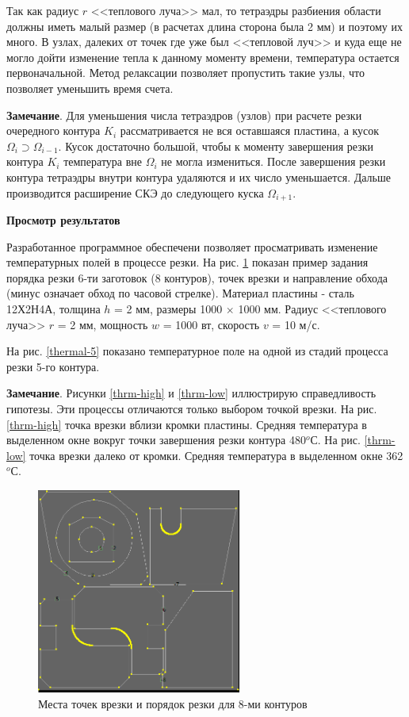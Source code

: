 \documentclass[11pt,twoside,openany]{report}
\begin{document}
Так как радиус  $r$
<<теплового луча>> мал,
то тетраэдры разбиения области должны иметь малый размер
(в расчетах длина сторона была  2 мм)
и поэтому их много.
В узлах, далеких от точек где уже был <<тепловой луч>>
и куда еще не могло дойти изменение тепла к данному моменту времени,
температура остается первоначальной.
Метод релаксации позволяет пропустить такие узлы,
что позволяет уменьшить время счета.

{\bf Замечание}.
Для уменьшения числа тетраэдров (узлов)
при расчете резки очередного контура
$K_i$
рассматривается не вся оставшаяся пластина, а кусок
$\Omega_i \supset \Omega_{i-1}$.
Кусок  достаточно большой,
чтобы к моменту завершения резки контура
$K_i$
температура вне
$\Omega_i$
не могла измениться.
После завершения резки контура
тетраэдры внутри контура удаляются и их число уменьшается.
Дальше производится расширение СКЭ до следующего куска
$\Omega_{i+1}$.

{\bf Просмотр результатов}

Разработанное программное обеспечени
позволяет просматривать изменение температурных полей
в процессе резки.
На рис. \ref{thermal-plan}
показан пример задания порядка резки
6-ти заготовок (8 контуров),
точек врезки и направление обхода
(минус означает обход по часовой стрелке).
Материал пластины -  сталь 12Х2Н4А,
толщина $h$ = 2 мм, размеры 1000 $\times$ 1000 мм.
Радиус <<теплового луча>> $r$ = 2 мм,
мощность $w$ = 1000 вт,
скорость $v$ = 10 м/с.

На рис. \ref{thermal-5} показано температурное поле
на одной из стадий процесса резки 5-го контура.

{\bf Замечание}.
Рисунки \ref{thrm-high} и \ref{thrm-low}  иллюстрирую справедливость гипотезы.
Эти процессы отличаются только выбором точкой врезки.
На рис. \ref{thrm-high} точка врезки вблизи кромки пластины.
Средняя температура в выделенном окне
вокруг точки завершения резки контура 480$^o$С.
На рис. \ref{thrm-low} точка врезки далеко от кромки.
Средняя температура в выделенном окне  362$^o$С.

\begin{figure}
  \centering
  \includegraphics[width=0.6\textwidth]{thermal-plan.png}
  \caption{Места точек врезки и порядок резки для 8-ми контуров}
  \label{thermal-plan}
\end{figure}
\end{document}
